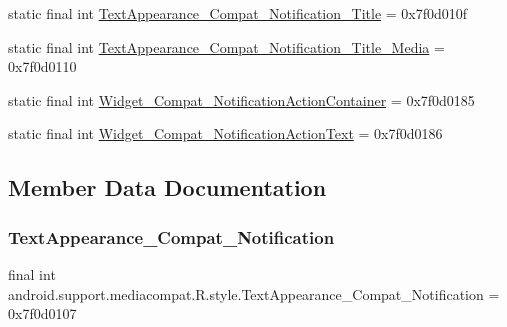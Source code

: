 \begin{DoxyCompactItemize}
\item 
static final int \mbox{\hyperlink{classandroid_1_1support_1_1mediacompat_1_1R_1_1style_aa75457e1e96c65ecdca35ee5ee2e692f}{Text\+Appearance\+\_\+\+Compat\+\_\+\+Notification\+\_\+\+Title}} = 0x7f0d010f
\item 
static final int \mbox{\hyperlink{classandroid_1_1support_1_1mediacompat_1_1R_1_1style_ad021488f0d0c66c33d37969b120ad507}{Text\+Appearance\+\_\+\+Compat\+\_\+\+Notification\+\_\+\+Title\+\_\+\+Media}} = 0x7f0d0110
\item 
static final int \mbox{\hyperlink{classandroid_1_1support_1_1mediacompat_1_1R_1_1style_abbc9df391b3fc86a6b9a0b3c0122a743}{Widget\+\_\+\+Compat\+\_\+\+Notification\+Action\+Container}} = 0x7f0d0185
\item 
static final int \mbox{\hyperlink{classandroid_1_1support_1_1mediacompat_1_1R_1_1style_a5b36689f13a047070defb7a11fd23580}{Widget\+\_\+\+Compat\+\_\+\+Notification\+Action\+Text}} = 0x7f0d0186
\end{DoxyCompactItemize}


\subsection{Member Data Documentation}
\mbox{\label{classandroid_1_1support_1_1mediacompat_1_1R_1_1style_a5be05765d7d9f2554774adfeb58216db}} 
\subsubsection{\texorpdfstring{Text\+Appearance\+\_\+\+Compat\+\_\+\+Notification}{TextAppearance\_Compat\_Notification}}
{\footnotesize\ttfamily final int android.\+support.\+mediacompat.\+R.\+style.\+Text\+Appearance\+\_\+\+Compat\+\_\+\+Notification = 0x7f0d0107\hspace{0.3cm}{\ttfamily [static]}}

\mbox{\label{classandroid_1_1support_1_1mediacompat_1_1R_1_1style_a64f71dddd320a8c3eed78e2455e727b8}} 
